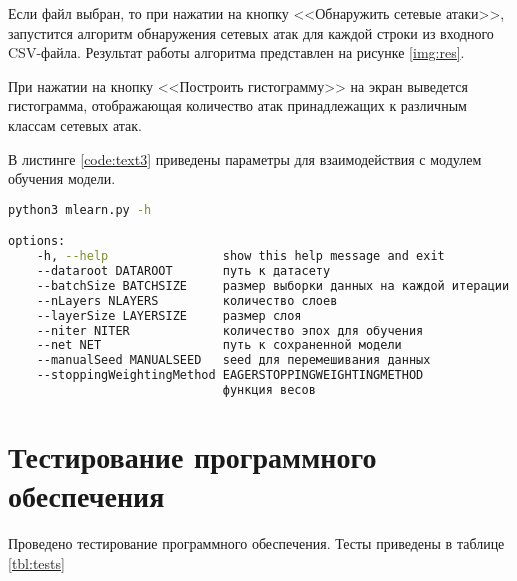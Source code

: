 Если файл выбран, то при нажатии на кнопку <<Обнаружить сетевые атаки>>, запустится алгоритм обнаружения сетевых атак для каждой строки из входного CSV-файла. 
Результат работы алгоритма представлен на рисунке \ref*{img:res}.



При нажатии на кнопку <<Построить гистограмму>> на экран выведется гистограмма,
отображающая количество атак принадлежащих к различным классам сетевых атак.

В листинге \ref*{code:text3} приведены параметры для взаимодействия с модулем обучения модели.

\begin{lstlisting}[label=code:text3, language=bash, caption={Взаимодействие с модулем модели}]
python3 mlearn.py -h

options:
    -h, --help                show this help message and exit
    --dataroot DATAROOT       путь к датасету
    --batchSize BATCHSIZE     размер выборки данных на каждой итерации
    --nLayers NLAYERS         количество слоев
    --layerSize LAYERSIZE     размер слоя
    --niter NITER             количество эпох для обучения
    --net NET                 путь к сохраненной модели
    --manualSeed MANUALSEED   seed для перемешивания данных
    --stoppingWeightingMethod EAGERSTOPPINGWEIGHTINGMETHOD
                              функция весов
\end{lstlisting}

\section{Тестирование программного обеспечения}
Проведено тестирование программного обеспечения. Тесты приведены в таблице \ref*{tbl:tests}

